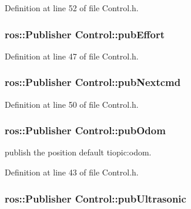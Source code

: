 Definition at line 52 of file Control.\-h.

\hypertarget{classControl_a3aaa95c82a13bc4d25aa983ec875f31f}{
\subsubsection[{pub\-Effort}]{\setlength{\rightskip}{0pt plus 5cm}ros\-::\-Publisher Control\-::pub\-Effort\hspace{0.3cm}{\ttfamily [private]}}}\label{classControl_a3aaa95c82a13bc4d25aa983ec875f31f}


Definition at line 47 of file Control.\-h.

\hypertarget{classControl_a709f0421b317029ef691d15d18974179}{
\subsubsection[{pub\-Nextcmd}]{\setlength{\rightskip}{0pt plus 5cm}ros\-::\-Publisher Control\-::pub\-Nextcmd\hspace{0.3cm}{\ttfamily [private]}}}\label{classControl_a709f0421b317029ef691d15d18974179}


Definition at line 50 of file Control.\-h.

\hypertarget{classControl_ae82077fb676becf3f23fd0d87b5b818c}{
\subsubsection[{pub\-Odom}]{\setlength{\rightskip}{0pt plus 5cm}ros\-::\-Publisher Control\-::pub\-Odom\hspace{0.3cm}{\ttfamily [private]}}}\label{classControl_ae82077fb676becf3f23fd0d87b5b818c}


publish the position default tiopic\-:odom. 



Definition at line 43 of file Control.\-h.

\hypertarget{classControl_a9e46e0589c03e37f3ade64d617e2d89c}{
\subsubsection[{pub\-Ultrasonic}]{\setlength{\rightskip}{0pt plus 5cm}ros\-::\-Publisher Control\-::pub\-Ultrasonic\hspace{0.3cm}{\ttfamily [private]}}}\label{classControl_a9e46e0589c03e37f3ade64d617e2d89c}


